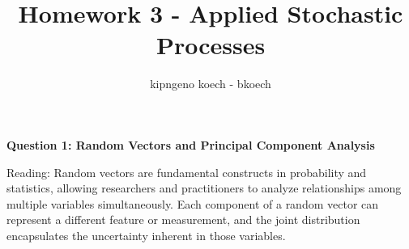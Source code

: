 \documentclass[a3paper,12pt]{extarticle} %
\begin{document}
\author{kipngeno koech - bkoech}
\title{Homework 3 - Applied Stochastic Processes}   
\maketitle

\medskip

\maketitle
\begin{center}
    \large \textbf{Question 1: Random Vectors and Principal Component Analysis}
\end{center}
Reading: Random vectors are fundamental constructs in probability and statistics, allowing researchers
and practitioners to analyze relationships among multiple variables simultaneously. Each component of a
random vector can represent a different feature or measurement, and the joint distribution encapsulates
the uncertainty inherent in those variables.
\end{document}
